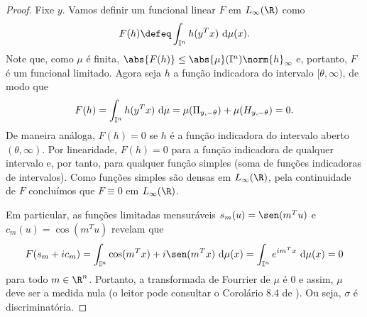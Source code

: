 \begin{proof}
    Fixe \( y \).
    Vamos definir um funcional linear \( F \) em \( L_{ \infty }(\R) \) como \[
        F(h) \defeq \int_{ \I^{ n } } h(y^{ T }x) \ \mathrm{d}\mu(x)
    .\]
    Note que, como \( \mu \) é finita, \( \abs{ F(h) } \leq \abs{ \mu }(\I^{ n }) \norm{ h }_{ \infty } \) e, portanto, \( F \) é um funcional limitado.
    Agora seja \( h \) a função indicadora do intervalo \( [\theta, \infty) \), de modo que \[
        F(h) = \int_{ \mathbb{I}^{ n } } h(y^{ T }x) \ \mathrm{d}\mu
        = \mu(\Pi_{ y, -\theta }) + \mu(H_{ y, -\theta }) = 0
    .\]
    De maneira análoga, \( F(h) = 0 \) se \( h \) é a função indicadora do intervalo aberto \( (\theta, \infty) \).
    Por linearidade, \( F(h) = 0 \) para a função indicadora de qualquer intervalo e, por tanto, para qualquer função simples (soma de funções indicadoras de intervalos).
    Como funções simples são densas em \( L_{ \infty }(\R) \), pela continuidade de \( F \) concluímos que \( F \equiv 0 \) em \( L_{ \infty }(\R) \).

    Em particular, as funções limitadas mensuráveis \( s_{ m }(u) = \sen(m^{ T }u) \) e \( c_{ m }(u) = \cos(m^{ T }u) \) revelam que \[
        F(s_{ m } + i c_{ m })
        = \int_{ \I^{ n } } \cos(m^{ T }x) + i \sen(m^{ T }x) \ \mathrm{d}\mu(x)
        = \int_{ \I^{ n } } e^{ i m^{ T }x } \ \mathrm{d}\mu(x)
        = 0
    \]
    para todo \( m \in \R^{ n } \).
    Portanto, a transformada de Fourrier de \( \mu \) é \( 0 \) e assim, \( \mu \) deve ser a medida nula (o leitor pode consultar o Corolário 8.4 de \cite{fourier}).
    Ou seja, \( \sigma \) é discriminatória.
\end{proof}


